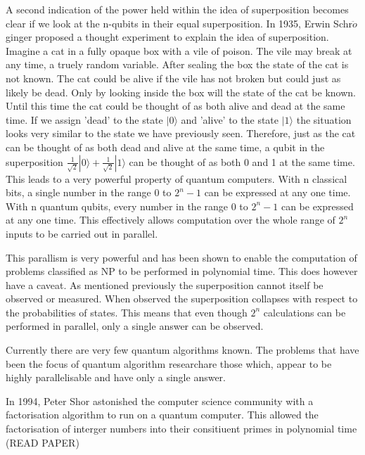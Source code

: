 \documentclass[authoryearcitations]{UoYCSproject}
\begin{document}
A second indication of the power held within the idea of superposition becomes clear if we look at the n-qubits in their equal superposition.
In 1935, Erwin Schr$\ddot{o}$ginger proposed a thought experiment to explain the idea of superposition.
Imagine a cat in a fully opaque box with a vile of poison.
The vile may break at any time, a truely random variable.
After sealing the box the state of the cat is not known.
The cat could be alive if the vile has not broken but could just as likely be dead.
Only by looking inside the box will the state of the cat be known.
Until this time the cat could be thought of as both alive and dead at the same time.
If we assign 'dead' to the state $|0\rangle$ and 'alive' to the state $|1\rangle$ the situation looks very similar to the state we have previously seen.
Therefore, just as the cat can be thought of as both dead and alive at the same time, a qubit in the superposition $\frac{1}{\sqrt{2}}|0\rangle+\frac{1}{\sqrt{2}}|1\rangle$ can be thought of as both 0 and 1 at the same time.
This leads to a very powerful property of quantum computers.
With n classical bits, a single number in the range 0 to $2^n-1$ can be expressed at any one time.
With n quantum qubits, every number in the range 0 to $2^n-1$ can be expressed at any one time.
This effectively allows computation over the whole range of $2^n$ inputs to be carried out in parallel.

This parallism is very powerful and has been shown to enable the computation of problems classified as NP to be performed in polynomial time.
This does however have a caveat.
As mentioned previously the superposition cannot itself be observed or measured.
When observed the superposition collapses with respect to the probabilities of states.
This means that even though $2^n$ calculations can be performed in parallel, only a single answer can be observed.



Currently there are very few quantum algorithms known.
The problems that have been the focus of quantum algorithm researchare those which, appear to be highly parallelisable and have only a single answer.

In 1994, Peter Shor astonished the computer science community with a factorisation algorithm to run on a quantum computer.
This allowed the factorisation of interger numbers into their consitiuent primes in polynomial time
(READ PAPER) 
	
\end{document}

